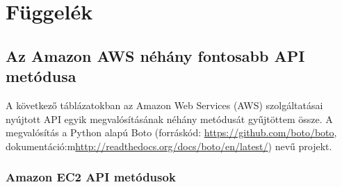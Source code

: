\appendix
\chapter*{Függelék}
\setcounter{chapter}{6}  %
\setcounter{equation}{0} %

\section{Az Amazon AWS néhány fontosabb API metódusa}

A következő táblázatokban az Amazon Web Services (AWS) szolgáltatásai nyújtott API egyik megvalósításának néhány metódusát gyűjtöttem össze. A megvalósítás a Python alapú Boto (forráskód: \href{https://github.com/boto/boto}{https://github.com/boto/boto}, dokumentáció:m\href{http://readthedocs.org/docs/boto/en/latest/}{http://readthedocs.org/docs/boto/en/latest/}) nevű projekt.



\subsection{Amazon EC2 API metódusok}

